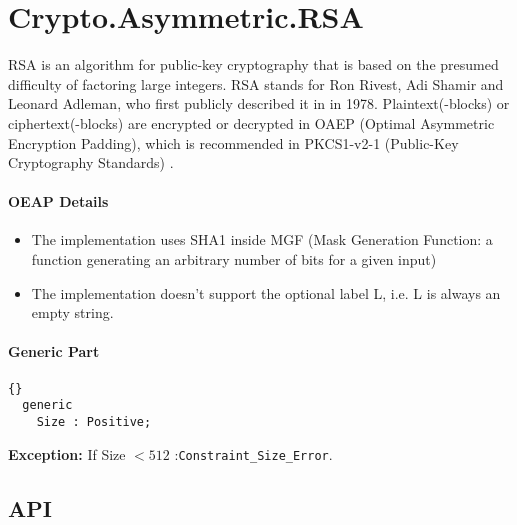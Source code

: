 \chapter{Crypto.Asymmetric.RSA}
RSA is an algorithm for public-key cryptography that is based on the
presumed difficulty of factoring large integers. RSA stands for Ron
Rivest, Adi Shamir and Leonard Adleman, who first publicly described
it in \cite{PKCS} in 1978. Plaintext(-blocks) or ciphertext(-blocks)
are encrypted or decrypted in OAEP (Optimal Asymmetric Encryption
Padding), which is recommended in PKCS1-v2-1 (Public-Key Cryptography
Standards) \cite{PKCS}.
\subsubsection*{OEAP Details}
\begin{itemize}
\item The implementation uses SHA1 inside MGF (Mask Generation
  Function: a function generating an arbitrary number of bits for a
  given input)
\item The implementation doesn't support the optional label L, i.e. L
  is always an empty string.
\end{itemize}
\subsubsection*{Generic Part}
\begin{lstlisting}{}
  generic
    Size : Positive;
\end{lstlisting}
\textbf{Exception:} If Size $< 512$ :\quad \texttt{Constraint\_Size\_Error}.\\
\section{API}

